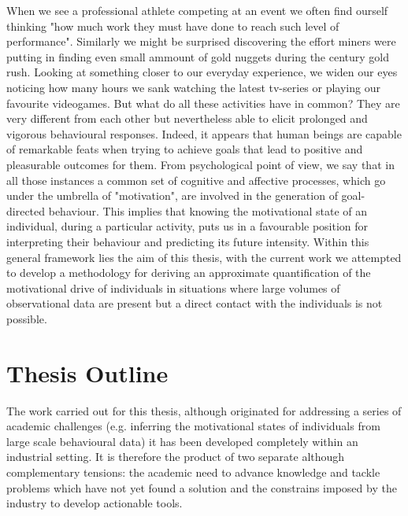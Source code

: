 When we see a professional athlete competing at an event we often find ourself thinking "how much work they must have done to reach such level of performance". Similarly we might be surprised discovering the effort miners were putting in finding even small ammount of gold nuggets during the  century gold rush. Looking at something closer to our everyday experience, we widen our eyes noticing how many hours we sank watching the latest tv-series or playing our favourite videogames. But what do all these activities have in common? They are very different from each other but nevertheless able to elicit prolonged and vigorous behavioural responses. Indeed, it appears that human beings are capable of remarkable feats when trying to achieve goals that lead to positive and pleasurable outcomes for them. From psychological point of view, we say that in all those instances a common set of cognitive and affective processes, which go under the umbrella of "motivation", are involved in the generation of goal-directed behaviour. This implies that knowing the motivational state of an individual, during a particular activity, puts us in a favourable position for interpreting their behaviour and predicting its future intensity. Within this general framework lies the aim of this thesis, with the current work we attempted to develop a methodology for deriving an approximate quantification of the motivational drive of individuals in situations where large volumes of observational data are present but a direct contact with the individuals is not possible.

\section*{Thesis Outline}
The work carried out for this thesis, although originated for addressing a series of academic challenges (e.g. inferring the motivational states of individuals from large scale behavioural data) it has been developed completely within an industrial setting. It is therefore the product of two separate although complementary tensions: the academic need to advance knowledge and tackle problems which have not yet found a solution and the constrains imposed by the industry to develop actionable tools.

